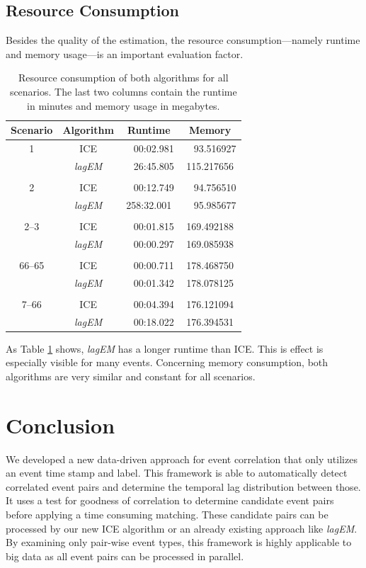 \documentclass[conference]{IEEEtran}
\theoremstyle{examplestyle}
\begin{document}
\subsection{Resource Consumption}
Besides the quality of the estimation, the resource consumption---namely runtime and memory usage---is an important evaluation factor. 


\begin{table}[!tb]
	\centering
	\begin{tabular}{c c c c}
		\textbf{Scenario} & \textbf{Algorithm} & \textbf{Runtime} & \textbf{Memory} \\
		\hline
		1	& \ac{ICE}				&	~~00:02.981	&	~~93.516927	\\
			& \textit{lagEM}		&	~~26:45.805	&	115.217656	\\
		\\
		2	& \ac{ICE}				&	~~00:12.749	&	~~94.756510	\\
			& \textit{lagEM}		&	258:32.001	&	~~95.985677	\\
		\\
		2--3 & \ac{ICE}				&	~~00:01.815	&	169.492188 \\
			&	\textit{lagEM}		&	~~00:00.297	&	169.085938 \\
		\\
		66--65 & \ac{ICE}			&	~~00:00.711	&	178.468750 \\
			&	\textit{lagEM}		&	~~00:01.342	&	178.078125 \\
		\\
		7--66 & \ac{ICE}			&	~~00:04.394	&	176.121094 \\
			&	\textit{lagEM}		&	~~00:18.022	&	176.394531 \\
	\end{tabular}
	\caption{Resource consumption of both algorithms for all scenarios. The last two columns contain the runtime in minutes and memory usage in megabytes.}
	\label{tbl:resources}
\end{table}



As Table \ref{tbl:resources} shows, \textit{lagEM} has a longer runtime than \ac{ICE}. This is effect is especially visible for many events. Concerning memory consumption, both algorithms are very similar and constant for all scenarios.



\section{Conclusion} \label{sec:conc}
We developed a new data-driven approach for event correlation that only utilizes an event time stamp and label. This framework is able to automatically detect correlated event pairs and determine the temporal lag distribution between those. It uses a  test for goodness of correlation to determine candidate event pairs before applying a time consuming matching. These candidate pairs can be processed by our new \ac{ICE} algorithm or an already existing approach like \textit{lagEM}. By examining only pair-wise event types, this framework is highly applicable to big data as all event pairs can be processed in parallel.
\end{document}

